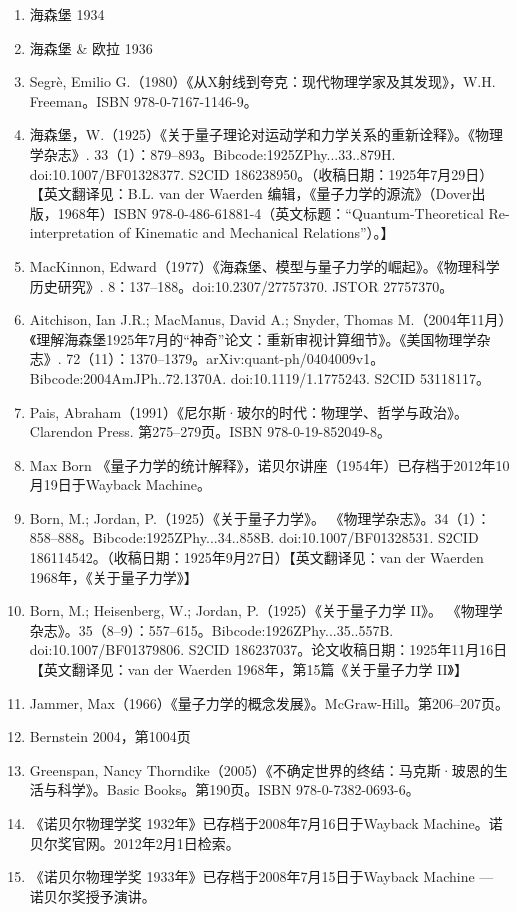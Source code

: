 \begin{enumerate}
\item 海森堡 1934  
\item 海森堡 & 欧拉 1936  
\item Segrè, Emilio G.（1980）《从X射线到夸克：现代物理学家及其发现》，W.H. Freeman。ISBN 978-0-7167-1146-9。  
\item 海森堡，W.（1925）《关于量子理论对运动学和力学关系的重新诠释》。《物理学杂志》. 33（1）：879–893。Bibcode:1925ZPhy...33..879H. doi:10.1007/BF01328377. S2CID 186238950。（收稿日期：1925年7月29日）【英文翻译见：B.L. van der Waerden 编辑，《量子力学的源流》（Dover出版，1968年）ISBN 978-0-486-61881-4（英文标题：“Quantum-Theoretical Re-interpretation of Kinematic and Mechanical Relations”）。】  
\item MacKinnon, Edward（1977）《海森堡、模型与量子力学的崛起》。《物理科学历史研究》. 8：137–188。doi:10.2307/27757370. JSTOR 27757370。  
\item Aitchison, Ian J.R.; MacManus, David A.; Snyder, Thomas M.（2004年11月）《理解海森堡1925年7月的“神奇”论文：重新审视计算细节》。《美国物理学杂志》. 72（11）：1370–1379。arXiv:quant-ph/0404009v1。Bibcode:2004AmJPh..72.1370A. doi:10.1119/1.1775243. S2CID 53118117。

\item Pais, Abraham（1991）《尼尔斯·玻尔的时代：物理学、哲学与政治》。Clarendon Press. 第275–279页。ISBN 978-0-19-852049-8。  
\item Max Born 《量子力学的统计解释》，诺贝尔讲座（1954年）已存档于2012年10月19日于Wayback Machine。  
\item Born, M.; Jordan, P.（1925）《关于量子力学》。 《物理学杂志》。34（1）：858–888。Bibcode:1925ZPhy...34..858B. doi:10.1007/BF01328531. S2CID 186114542。（收稿日期：1925年9月27日）【英文翻译见：van der Waerden 1968年，《关于量子力学》】  
\item Born, M.; Heisenberg, W.; Jordan, P.（1925）《关于量子力学 II》。 《物理学杂志》。35（8–9）：557–615。Bibcode:1926ZPhy...35..557B. doi:10.1007/BF01379806. S2CID 186237037。论文收稿日期：1925年11月16日【英文翻译见：van der Waerden 1968年，第15篇《关于量子力学 II》】  
\item Jammer, Max（1966）《量子力学的概念发展》。McGraw-Hill。第206–207页。  
\item Bernstein 2004，第1004页  
\item Greenspan, Nancy Thorndike（2005）《不确定世界的终结：马克斯·玻恩的生活与科学》。Basic Books。第190页。ISBN 978-0-7382-0693-6。  
\item 《诺贝尔物理学奖 1932年》已存档于2008年7月16日于Wayback Machine。诺贝尔奖官网。2012年2月1日检索。  
\item 《诺贝尔物理学奖 1933年》已存档于2008年7月15日于Wayback Machine — 诺贝尔奖授予演讲。


\end{enumerate}
